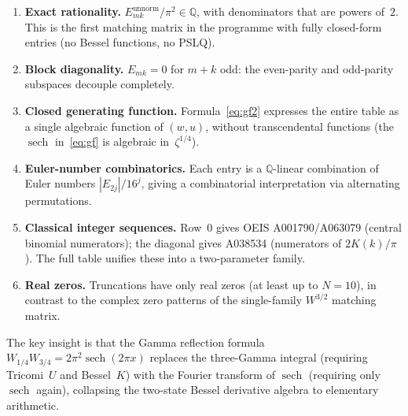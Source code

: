 \documentclass[11pt,a4paper]{article}
\newcommand{\Q}{\mathbb{Q}}
\begin{document}
\begin{enumerate}
\item \textbf{Exact rationality.} $E_{mk}^{\text{unnorm}}/\pi^2
  \in \Q$, with denominators that are powers of~$2$. This is the
  first matching matrix in the programme with fully closed-form
  entries (no Bessel functions, no PSLQ).

\item \textbf{Block diagonality.} $E_{mk} = 0$ for $m+k$ odd:
  the even-parity and odd-parity subspaces decouple completely.

\item \textbf{Closed generating function.}
  Formula~\eqref{eq:gf2} expresses the entire table as a single
  algebraic function of $(w,u)$, without transcendental functions
  (the $\operatorname{sech}$ in~\eqref{eq:gf} is
  algebraic in~$\zeta^{1/4}$).

\item \textbf{Euler-number combinatorics.} Each entry is a
  $\Q$-linear combination of Euler numbers $|E_{2j}|/16^j$, giving
  a combinatorial interpretation via alternating permutations.

\item \textbf{Classical integer sequences.} Row~0 gives OEIS
  A001790/A063079 (central binomial numerators); the diagonal
  gives A038534 (numerators of $2K(k)/\pi$). The full table
  unifies these into a two-parameter family.

\item \textbf{Real zeros.} Truncations have only real zeros
  (at least up to $N = 10$), in contrast to the complex zero
  patterns of the single-family $W^{3/2}$ matching matrix.
\end{enumerate}

The key insight is that the Gamma reflection formula
$W_{1/4}W_{3/4} = 2\pi^2\operatorname{sech}(2\pi x)$
replaces the three-Gamma integral (requiring Tricomi~$U$ and
Bessel~$K$) with the Fourier transform of $\operatorname{sech}$
(requiring only $\operatorname{sech}$ again), collapsing the
two-state Bessel derivative algebra to elementary arithmetic.
\end{document}
